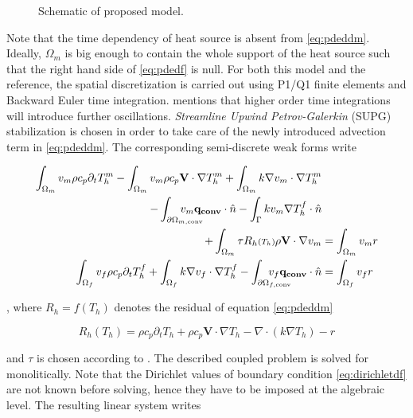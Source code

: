 \begin{figure}
  \centering
  \caption{Schematic of proposed model.}
  \label{fig:schematic}
\end{figure}

Note that the time dependency of heat source
is absent from \eqref{eq:pdeddm}. Ideally, $\Omega_m$ is big enough
to contain the whole support of the heat source such that
the right hand side of \eqref{eq:pdedf} is null.
For both this model and the reference, the spatial discretization
is carried out using P1/Q1 finite elements and Backward Euler
time integration. \citep{Puso2023} mentions that higher order
time integrations will introduce further oscillations.
\textit{Streamline Upwind Petrov-Galerkin} (SUPG) stabilization is chosen
in order to take care of the newly introduced advection term
in \eqref{eq:pdeddm}. The corresponding semi-discrete weak forms write


\begin{align}
  \label{eq:weakformdm}
    \int_{\Omega_m} v_m \rho c_p \partial_t T_h^m 
  - \int_{\Omega_m} v_m \rho c_p \mathbf{V} \cdot \nabla T_h^m
  + \int_{\Omega_m} k \nabla v_m \cdot \nabla T_h^m&\\
  - \int_{\partial \Omega_{m, \textrm{conv}}} \hspace{-8mm} v_m \mathbf{q_{conv}} \cdot \hat{n}
  - \int_{\Gamma} k v_m \nabla T_h^f \cdot \hat{n} &\notag\\
  + \int_{\Omega_m} \tau R_h\dependson{T_h} \rho \mathbf{V} \cdot \nabla v_m &= \int_{\Omega_m} v_m r \notag\\
  \label{eq:weakformdf}
    \int_{\Omega_f} v_f \rho c_p \partial_t T_h^f 
  + \int_{\Omega_f} k \nabla v_f \cdot \nabla T_h^f
  - \int_{\partial \Omega_{f, \textrm{conv}}} \hspace{-8mm} v_f \mathbf{q_{conv}} \cdot \hat{n} &= \int_{\Omega_f} v_f r
\end{align}

, where $R_h = f(T_h)$ denotes the residual of equation \eqref{eq:pdeddm}

$$
R_h(T_h) = \rho c_p \partial_t T_h + \rho c_p \mathbf{V} \cdot \nabla T_h - \nabla \cdot ( k \nabla T_h) - r
$$

and $\tau$ is chosen according to \cite{Codina2000}.
The described coupled problem is solved for monolitically.
Note that the Dirichlet values of boundary condition
\eqref{eq:dirichletdf} are not known before solving,
hence they have to be imposed at the algebraic level.
The resulting linear system writes

